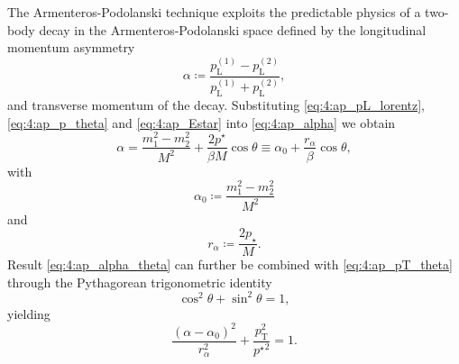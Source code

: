 The Armenteros-Podolanski technique exploits the predictable physics of a two-body decay in the Armenteros-Podolanski space defined by the longitudinal momentum asymmetry
\begin{equation}
	\alpha \coloneqq
	\frac
	{p_\text{L}^{(1)} - p_\text{L}^{(2)}}
	{p_\text{L}^{(1)} + p_\text{L}^{(2)}},
	\label{eq:4:ap_alpha}
\end{equation}
and transverse momentum \pt of the decay.
Substituting \eqref{eq:4:ap_pL_lorentz}, \eqref{eq:4:ap_p_theta} and \eqref{eq:4:ap_Estar} into \eqref{eq:4:ap_alpha} we obtain
\begin{equation}
\alpha =
\frac{m_1^2 - m_2^2}{M^2}
+
\frac{2p^\star}{\beta M} \cos\theta
\equiv
\alpha_0 + \frac{r_\alpha}{\beta} \cos\theta,
\label{eq:4:ap_alpha_theta}
\end{equation}
with
\begin{equation}
\alpha_0 \coloneqq \frac{m_1^2 - m_2^2}{M^2}
\end{equation}
and
\begin{equation}
r_\alpha \coloneqq \frac{2p_\star}{M}.
\end{equation}
Result \eqref{eq:4:ap_alpha_theta} can further be combined with \eqref{eq:4:ap_pT_theta} through the Pythagorean trigonometric identity
\begin{equation}
\cos^2 \theta + \sin^2 \theta = 1,
\end{equation}
yielding
\begin{equation}
\frac
{\left( \alpha - \alpha_0 \right)^2}
{r_\alpha^2}
+
\frac{p_\text{T}^2}{{p^\star}^2}
= 1.
\label{eq:4:ap_ellipse}
\end{equation}

